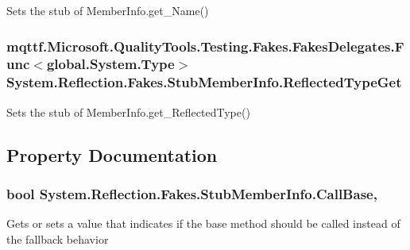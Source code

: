 Sets the stub of Member\-Info.\-get\-\_\-\-Name()

\hypertarget{class_system_1_1_reflection_1_1_fakes_1_1_stub_member_info_aff4209c9d65b00d7dd0bb3b5e261342a}{
\subsubsection[{Reflected\-Type\-Get}]{\setlength{\rightskip}{0pt plus 5cm}mqttf.\-Microsoft.\-Quality\-Tools.\-Testing.\-Fakes.\-Fakes\-Delegates.\-Func$<$global.\-System.\-Type$>$ System.\-Reflection.\-Fakes.\-Stub\-Member\-Info.\-Reflected\-Type\-Get}}\label{class_system_1_1_reflection_1_1_fakes_1_1_stub_member_info_aff4209c9d65b00d7dd0bb3b5e261342a}


Sets the stub of Member\-Info.\-get\-\_\-\-Reflected\-Type()



\subsection{Property Documentation}
\hypertarget{class_system_1_1_reflection_1_1_fakes_1_1_stub_member_info_a94e5c7cd9cbbec0ac40f5491efcc309c}{
\subsubsection[{Call\-Base}]{\setlength{\rightskip}{0pt plus 5cm}bool System.\-Reflection.\-Fakes.\-Stub\-Member\-Info.\-Call\-Base\hspace{0.3cm}{\ttfamily [get]}, {\ttfamily [set]}}}\label{class_system_1_1_reflection_1_1_fakes_1_1_stub_member_info_a94e5c7cd9cbbec0ac40f5491efcc309c}


Gets or sets a value that indicates if the base method should be called instead of the fallback behavior

